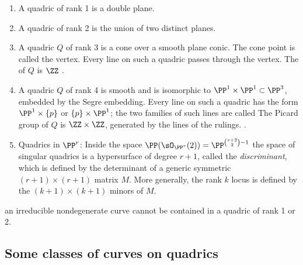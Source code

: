 \begin{enumerate}
\item A quadric of rank 1 is a double plane.
%
\item A quadric of rank 2 is the union of two distinct planes. 
\item A quadric $Q$ of rank 3 is a cone over a smooth plane conic. The cone point is called the vertex. Every line
%
on such a quadric passes through the vertex. The 
of $Q$ is $\ZZ$
\cite[Exercise II.6.5]{Hartshorne1977}.

\item A quadric $Q$ of rank 4 is smooth and is isomorphic to
  $\PP^{1}\times \PP^{1} \subset \PP^{3}$, embedded by the Segre
  embedding. Every line on such a quadric has the form $\PP^{1}\times
  \{p\}$ or $\{p\} \times \PP^{1}$; the two families of such lines are
  called 
%
%
\label{smooth quadric}
The Picard group of $Q$ is $\ZZ\times \ZZ$, generated by the lines of the rulings.
\cite[Example II.6.1]{Hartshorne1977}.

\item Quadrics in $\PP^{r}$: Inside the space $\PP(\sO_{\PP^{r}}(2)) = \PP^{\binom{r+2}{2}-1}$ the space
of singular quadrics is a hypersurface of degree $r+1$, called the \emph{discriminant}, which is defined by the determinant of a generic symmetric
%
$(r+1)\times (r+1)$ matrix $M$. More generally, the rank $k$ locus is defined by the $(k+1)\times (k+1)$
minors of $M$.
\end{enumerate}


an irreducible nondegenerate  curve cannot be contained in a quadric of rank 1 or 2.

\subsection*{Some classes of curves on quadrics}

